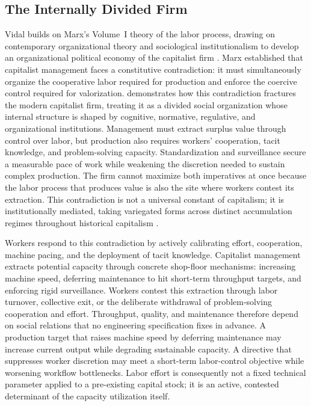 \subsection{The Internally Divided Firm}


Vidal builds on Marx's Volume~I theory of the labor process, drawing on contemporary organizational theory and sociological institutionalism to develop an organizational political economy of the capitalist firm \citep{VidalPeck2012, Vidal2022}. Marx established that
capitalist management faces a constitutive contradiction: it
must simultaneously organize the cooperative labor required for
production and enforce the coercive control required for
valorization. \citet{Vidal2022} demonstrates how this contradiction fractures
the modern capitalist firm, treating it as a divided social
organization whose internal structure is shaped by cognitive,
normative, regulative, and organizational institutions. Management must extract surplus value through
control over labor, but production also requires workers'
cooperation, tacit knowledge, and problem-solving capacity.
Standardization and surveillance secure a measurable pace of
work while weakening the discretion needed to sustain complex
production. The firm cannot maximize both imperatives at once
because the labor process that produces value is also the site
where workers contest its extraction. This contradiction is not
a universal constant of capitalism; it is institutionally
mediated, taking variegated forms across distinct accumulation regimes throughout historical capitalism
\citep{Vidal2019}.

Workers respond to this contradiction by actively calibrating
effort, cooperation, machine pacing, and the deployment of tacit
knowledge. Capitalist management extracts potential capacity
through concrete shop-floor mechanisms: increasing machine speed,
deferring maintenance to hit short-term throughput targets, and
enforcing rigid surveillance. Workers contest this extraction
through labor turnover, collective exit, or the deliberate
withdrawal of problem-solving cooperation and effort. Throughput,
quality, and maintenance therefore depend on social relations
that no engineering specification fixes in advance. A production
target that raises machine speed by deferring maintenance may
increase current output while degrading sustainable capacity. A
directive that suppresses worker discretion may meet a
short-term labor-control objective while worsening workflow
bottlenecks. Labor effort is consequently not a fixed technical
parameter applied to a pre-existing capital stock; it is an
active, contested determinant of the capacity utilization itself.

